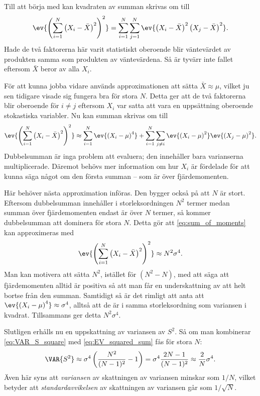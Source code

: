 Till att börja med kan kvadraten av summan skrivas om till
\begin{equation}
\ev{\left(\sum_{i=1}^N\left(X_i-\bar{X}\right)^2 \right)^2} 
= \sum_{i=1}^N \sum_{j=1}^N
\ev{ \left(X_i-\bar{X}\right)^2\left(X_j-\bar{X}\right)^2 }.
\end{equation}
Hade de två faktorerna här varit statistiskt oberoende blir väntevärdet av produkten samma som produkten av väntevärdena\cite{Rice_matstat2006}. Så är tyvärr inte fallet eftersom $\bar{X}$ beror av alla $X_i$.

För att kunna jobba vidare används approximationen att sätta $\bar{X}\approx \mu$, vilket ju sen tidigare visade sig fungera bra för stora $N$. Detta ger att de två faktorerna blir oberoende för $i\neq j$ eftersom $X_i$ var satta att vara en uppsättning oberoende stokastiska variabler. Nu kan summan skrivas om till
\begin{equation}\label{eq:sum_of_moments}
\ev{\left(\sum_{i=1}^N\left(X_i-\bar{X}\right)^2 \right)^2} 
\approx
\sum_{i=1}^N \ev{\left(X_i-\mu \right)^4} 
+\sum_{i=1}^N\sum_{j\neq i} 
\ev{\left(X_i-\mu \right)^2}\ev{\left(X_j-\mu \right)^2}.
\end{equation}
Dubbelsumman är inga problem att evaluera; den innehåller bara varianserna multiplicerade. Däremot behövs mer information om hur $X_i$ är fördelade för att kunna säga något om den första summan -- som är över fjärdemomenten.

Här behöver nästa approximation införas. Den bygger också på att $N$ är stort. Eftersom dubbelsumman innehåller i storleksordningen $N^2$ termer medan summan över fjärdemomenten endast är över $N$ termer, så kommer dubbelsumman att dominera för stora $N$. Detta gör att \eqref{eq:sum_of_moments} kan approximeras med
\begin{equation}\label{eq:EV_squared_sum}
\ev{\left(\sum_{i=1}^N\left(X_i-\bar{X}\right)^2 \right)^2} 
\approx
N^2\sigma^4.
\end{equation}
Man kan motivera att sätta $N^2$, istället för $(N^2-N)$, med att säga att fjärdemomenten alltid är positiva så att man får en underskattning av att helt bortse från den summan. Samtidigt så är det rimligt att anta att $\ev{\left(X_i-\mu\right)^4}\approx\sigma^4$, alltså att de är i samma storleksordning som variansen i kvadrat. Tillsammans ger detta $N^2\sigma^4$.

Slutligen erhålls nu en uppskattning av variansen av $S^2$. Så om man kombinerar \eqref{eq:VAR_S_square} med \eqref{eq:EV_squared_sum} fås för stora $N$: 
\begin{equation}
\VAR{S^2} 
\approx \sigma^4\left(\frac{N^2}{(N-1)^2} -1 \right) 
=\sigma^4\frac{2N-1}{(N-1)^2}
\approx \frac{2}{N}\sigma^4.
\end{equation}
Även här syns att \emph{variansen} av skattningen av variansen minskar som $1/N$, vilket betyder att \emph{standardavvikelsen} av skattningen av variansen går som $1/\sqrt{N}$. 


